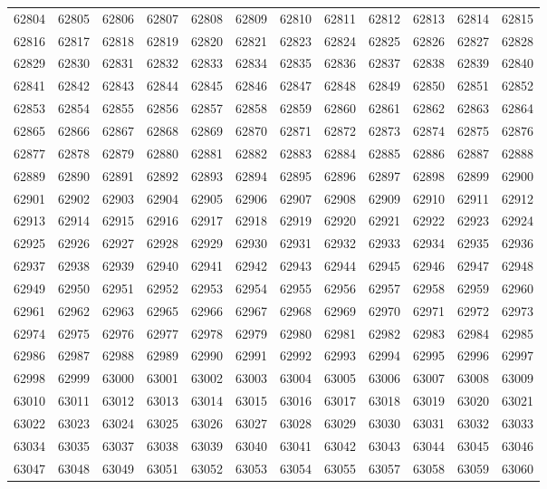 \begin{center}
\begin{longtable}{llllllllllll}
62804 &62805 &62806 &62807 &62808 &62809 &62810 &62811 &62812 &62813 &62814 &62815 \\
62816 &62817 &62818 &62819 &62820 &62821 &62823 &62824 &62825 &62826 &62827 &62828 \\
62829 &62830 &62831 &62832 &62833 &62834 &62835 &62836 &62837 &62838 &62839 &62840 \\
62841 &62842 &62843 &62844 &62845 &62846 &62847 &62848 &62849 &62850 &62851 &62852 \\
62853 &62854 &62855 &62856 &62857 &62858 &62859 &62860 &62861 &62862 &62863 &62864 \\
62865 &62866 &62867 &62868 &62869 &62870 &62871 &62872 &62873 &62874 &62875 &62876 \\
62877 &62878 &62879 &62880 &62881 &62882 &62883 &62884 &62885 &62886 &62887 &62888 \\
62889 &62890 &62891 &62892 &62893 &62894 &62895 &62896 &62897 &62898 &62899 &62900 \\
62901 &62902 &62903 &62904 &62905 &62906 &62907 &62908 &62909 &62910 &62911 &62912 \\
62913 &62914 &62915 &62916 &62917 &62918 &62919 &62920 &62921 &62922 &62923 &62924 \\
62925 &62926 &62927 &62928 &62929 &62930 &62931 &62932 &62933 &62934 &62935 &62936 \\
62937 &62938 &62939 &62940 &62941 &62942 &62943 &62944 &62945 &62946 &62947 &62948 \\
62949 &62950 &62951 &62952 &62953 &62954 &62955 &62956 &62957 &62958 &62959 &62960 \\
62961 &62962 &62963 &62965 &62966 &62967 &62968 &62969 &62970 &62971 &62972 &62973 \\
62974 &62975 &62976 &62977 &62978 &62979 &62980 &62981 &62982 &62983 &62984 &62985 \\
62986 &62987 &62988 &62989 &62990 &62991 &62992 &62993 &62994 &62995 &62996 &62997 \\
62998 &62999 &63000 &63001 &63002 &63003 &63004 &63005 &63006 &63007 &63008 &63009 \\
63010 &63011 &63012 &63013 &63014 &63015 &63016 &63017 &63018 &63019 &63020 &63021 \\
63022 &63023 &63024 &63025 &63026 &63027 &63028 &63029 &63030 &63031 &63032 &63033 \\
63034 &63035 &63037 &63038 &63039 &63040 &63041 &63042 &63043 &63044 &63045 &63046 \\
63047 &63048 &63049 &63051 &63052 &63053 &63054 &63055 &63057 &63058 &63059 &63060 \\

\end{longtable}
\end{center}
